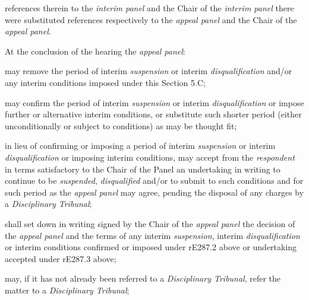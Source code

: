 references therein to the \emph{interim panel} and the Chair of
the \emph{interim panel} there were substituted references respectively
to the \emph{appeal panel} and the Chair of the \emph{appeal panel}.\\
\par
At the conclusion of the hearing the \emph{appeal panel}:\\\nl \item may remove the period of interim \emph{suspension} or
interim \emph{disqualification} and/or any interim conditions imposed
under this\textbf{ }Section\textbf{ }5.C;\item may confirm the period of interim \emph{suspension} or
interim \emph{disqualification} or impose further or alternative interim
conditions, or substitute such shorter period (either unconditionally or
subject to conditions) as may be thought fit;\item in lieu of confirming or imposing a period of
interim \emph{suspension} or interim \emph{disqualification} or imposing
interim conditions, may accept from the \emph{respondent} in terms
satisfactory to the Chair of the Panel an undertaking in writing to
continue to be \emph{suspended}, \emph{disqualified} and/or to submit to
such conditions and for such period as the \emph{appeal panel} may
agree, pending the disposal of any charges by a \emph{Disciplinary
Tribunal};\item shall set down in writing signed by the Chair of the \emph{appeal
panel} the decision of the \emph{appeal panel} and the terms of any
interim \emph{suspension}, interim \emph{disqualification} or interim
conditions confirmed or imposed under rE287.2 above or undertaking
accepted under rE287.3 above;\item may, if it has not already been referred to a \emph{Disciplinary
Tribunal}, refer the matter to a \emph{Disciplinary Tribunal};\ln

